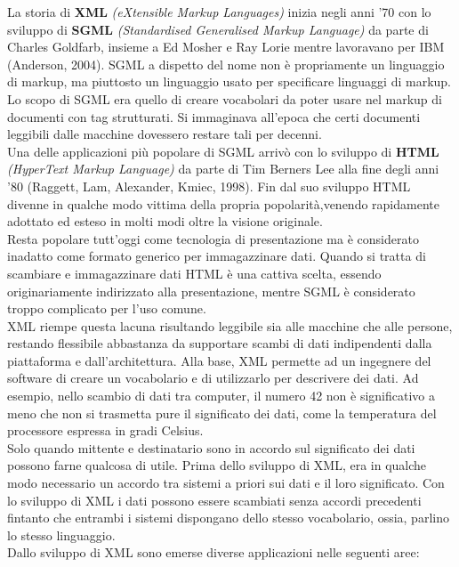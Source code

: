\documentclass[12pt,a4paper,openright,twoside]{report}
\theoremstyle{definition}
\begin{document}
La storia di \textbf{XML} \emph{(eXtensible Markup Languages)} inizia negli anni '70 con lo sviluppo di \textbf{SGML} \emph{(Standardised Generalised Markup Language)} da parte di  Charles Goldfarb, insieme a Ed Mosher e Ray Lorie mentre lavoravano per IBM (Anderson, 2004). SGML a dispetto del nome non è propriamente un linguaggio di markup, ma piuttosto un linguaggio usato per specificare linguaggi di markup. Lo scopo di SGML era quello di creare vocabolari da poter usare nel markup di documenti con tag strutturati. Si immaginava all'epoca che certi documenti leggibili dalle macchine dovessero restare tali per decenni.
\\
Una delle applicazioni più popolare di SGML arrivò con lo sviluppo di \textbf{HTML} \emph{(HyperText Markup Language)} da parte di Tim Berners Lee alla fine degli anni '80 (Raggett, Lam, Alexander, Kmiec, 1998). Fin dal suo sviluppo HTML divenne in qualche modo vittima della propria popolarità,venendo rapidamente adottato ed esteso in molti modi oltre la visione originale.\\ Resta popolare tutt'oggi come tecnologia di presentazione ma è considerato inadatto come formato generico per immagazzinare dati. Quando si tratta di scambiare e immagazzinare dati HTML è una cattiva scelta, essendo originariamente indirizzato alla presentazione, mentre SGML è considerato troppo complicato per l'uso comune.
\\
XML riempe questa lacuna risultando leggibile sia alle macchine che alle persone, restando flessibile abbastanza da supportare scambi di dati indipendenti dalla piattaforma e dall'architettura.
Alla base, XML permette ad un ingegnere del software di creare un vocabolario e di utilizzarlo per descrivere dei dati. Ad esempio, nello scambio di dati tra computer, il numero 42 non è significativo a meno che non si trasmetta pure il significato dei dati, come la temperatura del processore espressa in gradi Celsius.
\\
Solo quando mittente e destinatario sono in accordo sul significato dei dati possono farne qualcosa di utile. Prima dello sviluppo di XML,
era in qualche modo necessario un accordo tra sistemi a priori sui dati e il loro significato. Con lo sviluppo di XML i dati possono essere scambiati senza accordi precedenti fintanto che entrambi i sistemi dispongano dello stesso vocabolario, ossia, parlino lo stesso linguaggio.
\\
Dallo sviluppo di XML sono emerse diverse applicazioni nelle seguenti aree:
\end{document}
